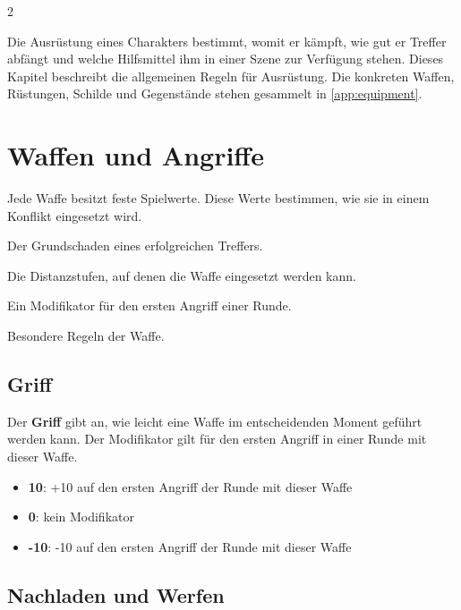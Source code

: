 \label{ch:ausruestung}

\begin{multicols*}{2}

Die Ausrüstung eines Charakters bestimmt, womit er kämpft, wie gut er Treffer abfängt und welche Hilfsmittel ihm in einer Szene zur Verfügung stehen.
Dieses Kapitel beschreibt die allgemeinen Regeln für Ausrüstung.
Die konkreten Waffen, Rüstungen, Schilde und Gegenstände stehen gesammelt in \cref{app:equipment}.

\section{Waffen und Angriffe}\label{sec:waffen}

Jede Waffe besitzt feste Spielwerte.
Diese Werte bestimmen, wie sie in einem Konflikt eingesetzt wird.

\begin{description}[style=nextline,leftmargin=0pt]
\item[\textbf{Schaden}] Der Grundschaden eines erfolgreichen Treffers.
\item[\textbf{Reichweite}] Die Distanzstufen, auf denen die Waffe eingesetzt werden kann.
\item[\textbf{Griff}] Ein Modifikator für den ersten Angriff einer Runde.
\item[\textbf{Eigenschaften}] Besondere Regeln der Waffe.
\end{description}

\subsection{Griff}\label{subsec:griff}

Der \textbf{Griff} gibt an, wie leicht eine Waffe im entscheidenden Moment geführt werden kann.
Der Modifikator gilt für den ersten Angriff in einer Runde mit dieser Waffe.

\begin{itemize}[leftmargin=*]
\item \textbf{10}: +10 auf den ersten Angriff der Runde mit dieser Waffe
\item \textbf{0}: kein Modifikator
\item \textbf{-10}: -10 auf den ersten Angriff der Runde mit dieser Waffe
\end{itemize}

\subsection{Nachladen und Werfen}


\end{multicols*}
